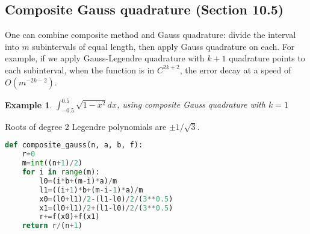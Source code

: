 \documentclass[20pt]{article} %
\theoremstyle{break}
\newtheorem{exa}[definition]{Example}
\begin{document}
\newpage

\subsection{Composite Gauss quadrature (Section 10.5)}

One can combine composite method and Gauss quadrature: divide the interval into $m$ subintervals of equal length, then apply Gauss quadrature on each. For example, if we apply Gauss-Legendre quadrature with $k+1$ quadrature points to each subinterval, when the function is in $C^{2k+2}$, the error decay at a speed of $O(m^{-2k-2})$.

\newpage

\begin{exa} $\int_{-0.5}^{0.5}\sqrt{1-x^2}dx$, using composite Gauss quadrature with $k=1$\end{exa}

Roots of degree $2$ Legendre polynomials are $\pm1/\sqrt{3}$.

\begin{lstlisting}[language=Python]
def composite_gauss(n, a, b, f):
    r=0
    m=int((n+1)/2)
    for i in range(m):
        l0=(i*b+(m-i)*a)/m
        l1=((i+1)*b+(m-i-1)*a)/m
        x0=(l0+l1)/2-(l1-l0)/2/(3**0.5)
        x1=(l0+l1)/2+(l1-l0)/2/(3**0.5)
        r+=f(x0)+f(x1)
    return r/(n+1)
\end{lstlisting}
\end{document}
